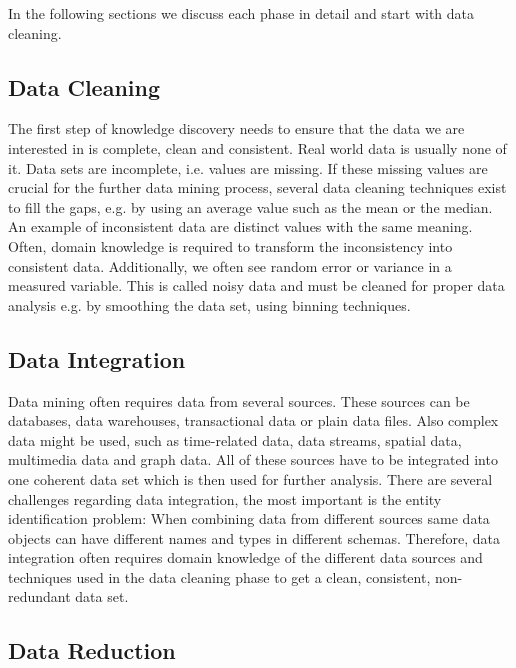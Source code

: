 In the following sections we discuss each phase in detail and start with data cleaning. 

\subsection{Data Cleaning} 
The first step of knowledge discovery needs to ensure that the data we are interested in is complete, clean and consistent. Real world data is usually none of it. Data sets are incomplete, i.e. values are missing. If these missing values are crucial for the further data mining process, several data cleaning techniques exist to fill the gaps, e.g. by using an average value such as the mean or the median.
\\
An example of inconsistent data are distinct values with the same meaning. Often, domain knowledge is required to transform the inconsistency into consistent data. Additionally, we often see random error or variance in a measured variable. This is called noisy data and must be cleaned for proper data analysis e.g. by smoothing the data set, using binning techniques.


\subsection{Data Integration}

Data mining often requires data from several sources. These sources can be databases, data warehouses, transactional data or plain data files. Also complex data might be used, such as time-related data, data streams, spatial data, multimedia data and graph data. All of these sources have to be integrated into one coherent data set which is then used for further analysis. There are several challenges regarding data integration, the most important is the entity identification problem: When combining data from different sources same data objects can have different names and types in different schemas. Therefore, data integration often requires domain knowledge of the different data sources and techniques used in the data cleaning phase to get a clean, consistent, non-redundant data set.


\subsection{Data Reduction}

